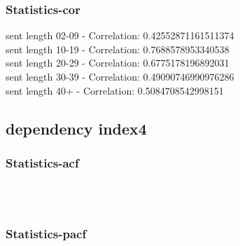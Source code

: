 \documentclass{article}%
\begin{document}
%
\newpage%
\subsubsection{Statistics{-}cor}%
\label{ssubsec:Statistics{-}cor}%
\noindent%
sent length 02-09 - Correlation: 0.42552871161511374\\%
sent length 10-19 - Correlation: 0.7688578953340538\\%
sent length 20-29 - Correlation: 0.6775178196892031\\%
sent length 30-39 - Correlation: 0.49090746990976286\\%
sent length 40+ - Correlation: 0.5084708542998151\\

%
\newpage

%
\subsection{dependency index4}%
\label{subsec:dependencyindex4}%
\subsubsection{Statistics{-}acf}%
\label{ssubsec:Statistics{-}acf}%


\begin{figure}[ht]%
\centering%
\setlength{\abovecaptionskip}{-35pt}%
%
%
\\%
%
%
\\%
%
\end{figure}

%
\newpage%
\subsubsection{Statistics{-}pacf}%
\label{ssubsec:Statistics{-}pacf}%
\end{document}
